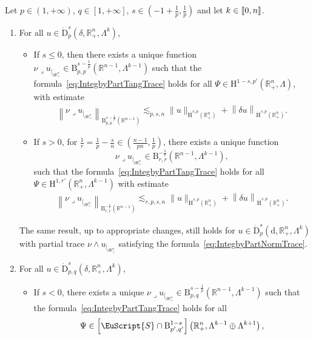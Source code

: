 \documentclass[AHL,Unicode,longabstracts,published]{cedram}
\newcommand{\bbR}{\mathbb{R}}
\newcommand{\rmH}{\mathrm{H}}%
\newcommand{\rmB}{\mathrm{B}}
\newcommand{\rmd}{\mathrm{d}}
\newcommand{\rmD}{\mathrm{D}}
\newcommand{\eus}{\EuScript}
\newcommand{\llbracket}{\mathopen{[\mkern -2.7mu[}}
\newcommand{\rrbracket}{\mathclose{]\mkern -2.7mu]}}
\newcommand{\llb}{\llbracket}
\newcommand{\rrb}{\rrbracket}
\newcommand{\iprod}{\mathbin{\lrcorner}}
\newcommand*{\romanenumi}{\renewcommand*{\theenumi}{\roman{enumi}}}
\begin{document}
\begin{theo}\label{thm:TracesDifferentialformsHomSpaces}
Let $p\in(1,+\infty)$, $q\in[1,+\infty]$, $s\in(-1+\frac{1}{p},\frac{1}{p})$ and let $k\in\llb 0,n\rrb$.
\begin{enumerate}\romanenumi
\item\label{theoA.2.1} For all $u\in{\dot{\rmD}}^{s}_{p}(\delta,\bbR^{n}_+,\Lambda^k)$,
\begin{itemize}
\item If $s\leqslant 0$, then there exists a unique function $\nu\iprod u_{|_{\partial\bbR^n_+}}\in \rmB^{s-\frac{1}{p}}_{p,p}(\bbR^{n-1},\Lambda^{k-1})$ such that the formula~\eqref{eq:IntegbyPartTangTrace} holds for all $\Psi\in \rmH^{1-s,p'}(\bbR^n_+, \Lambda)$, with estimate
\begin{align*}
\left\|\nu\iprod u_{|_{\partial\bbR^n_+}} \right\|_{\rmB^{s-\frac{1}{p}}_{p,p}\left(\bbR^{n-1}\right)}\lesssim_{p,s,n} \| u \|_{{\dot{\rmH}}^{s,p}\left(\bbR^n_+\right)} +
\left\| \delta u \right\|_{{\dot{\rmH}}^{s,p}\left(\bbR^n_+\right)} .
\end{align*}
\item If $s> 0$, for $\frac{1}{r}=\frac{1}{p}-\frac{s}{n}\in(\frac{n-1}{pn},\frac{1}{p})$, there exists a unique function
\[
\nu\iprod u_{|_{\partial\bbR^n_+}}\in \rmB^{-\frac{1}{r}}_{r,r}\left(\bbR^{n-1},\Lambda^{k-1}\right),
\]
such that the formula~\eqref{eq:IntegbyPartTangTrace} holds for all $\Psi\in \rmH^{1,r'}(\bbR^n_+, \Lambda^{k-1})$ with estimate
\begin{align*}
\left\|\nu\iprod u_{|_{\partial\bbR^n_+}}\right\|_{\rmB^{-\frac{1}{r}}_{r,r}\left(\bbR^{n-1}\right)}\lesssim_{r,p,s,n} \| u \|_{{\dot{\rmH}}^{s,p}\left(\bbR^n_+\right)} +
\left\| \delta u\right\|_{{\dot{\rmH}}^{s,p}\left(\bbR^n_+\right)} .
\end{align*}
\end{itemize}
The same result, up to appropriate changes, still holds for $u\in {\dot{\rmD}}^{s}_{p}(\rmd,\bbR^{n}_+,\Lambda^k)$ with partial trace $\nu\wedge u_{|_{\partial\bbR^n_+}}$ satisfying the formula~\eqref{eq:IntegbyPartNormTrace}.
\item\label{theoA.2.2}  For all $u\in {\dot{\rmD}}^{s}_{p,q}(\delta,\bbR^{n}_+,\Lambda^k)$,
\begin{itemize}
\item If $s < 0$, there exists a unique $\nu\iprod u_{|_{\partial\bbR^n_+}}\in \rmB^{s-\frac{1}{p}}_{p,q}(\bbR^{n-1},\Lambda^{k-1})$ such that the formula~\eqref{eq:IntegbyPartTangTrace} holds for all
\[
\Psi\in \left[\eus{S}\cap\rmB^{1-s}_{p',q'}\right]\left(\bbR^n_+, \Lambda^{k-1}\oplus\Lambda^{k+1}\right),
\]
\end{itemize}
\end{enumerate}
\end{theo}
\end{document}
